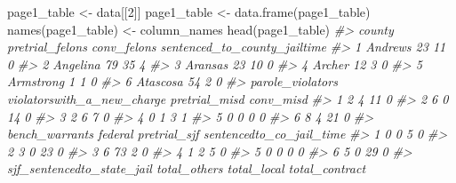 \documentclass[
  12pt,
]{book}
\newenvironment{Shaded}{\begin{snugshade}}{\end{snugshade}}
\newcommand{\CommentTok}[1]{\textcolor[rgb]{0.37,0.37,0.37}{\textit{#1}}}
\newcommand{\DecValTok}[1]{\textcolor[rgb]{0.06,0.06,0.06}{#1}}
\newcommand{\FunctionTok}[1]{\textcolor[rgb]{0,0,0}{#1}}
\newcommand{\NormalTok}[1]{#1}
\newcommand{\OtherTok}[1]{\textcolor[rgb]{0.37,0.37,0.37}{#1}}
\begin{document}
\begin{Shaded}
\begin{Highlighting}[]
\NormalTok{page1\_table }\OtherTok{\textless{}{-}}\NormalTok{ data[[}\DecValTok{2}\NormalTok{]]}
\NormalTok{page1\_table }\OtherTok{\textless{}{-}} \FunctionTok{data.frame}\NormalTok{(page1\_table)}
\FunctionTok{names}\NormalTok{(page1\_table) }\OtherTok{\textless{}{-}}\NormalTok{ column\_names}
\FunctionTok{head}\NormalTok{(page1\_table)}
\CommentTok{\#\textgreater{}      county pretrial\_felons conv\_felons sentenced\_to\_county\_jailtime}
\CommentTok{\#\textgreater{} 1   Andrews              23          11                            0}
\CommentTok{\#\textgreater{} 2  Angelina              79          35                            4}
\CommentTok{\#\textgreater{} 3   Aransas              23          10                            0}
\CommentTok{\#\textgreater{} 4    Archer              12           3                            0}
\CommentTok{\#\textgreater{} 5 Armstrong               1           1                            0}
\CommentTok{\#\textgreater{} 6  Atascosa              54           2                            0}
\CommentTok{\#\textgreater{}   parole\_violators violatorswith\_a\_new\_charge pretrial\_misd conv\_misd}
\CommentTok{\#\textgreater{} 1                2                          4            11         0}
\CommentTok{\#\textgreater{} 2                6                          0            14         0}
\CommentTok{\#\textgreater{} 3                2                          6             7         0}
\CommentTok{\#\textgreater{} 4                0                          1             3         1}
\CommentTok{\#\textgreater{} 5                0                          0             0         0}
\CommentTok{\#\textgreater{} 6                8                          4            21         0}
\CommentTok{\#\textgreater{}   bench\_warrants federal pretrial\_sjf sentencedto\_co\_jail\_time}
\CommentTok{\#\textgreater{} 1              0       0            5                        0}
\CommentTok{\#\textgreater{} 2              3       0           23                        0}
\CommentTok{\#\textgreater{} 3              6      73            2                        0}
\CommentTok{\#\textgreater{} 4              1       2            5                        0}
\CommentTok{\#\textgreater{} 5              0       0            0                        0}
\CommentTok{\#\textgreater{} 6              5       0           29                        0}
\CommentTok{\#\textgreater{}   sjf\_sentencedto\_state\_jail total\_others total\_local total\_contract}

\end{Highlighting}
\end{Shaded}
\end{document}
